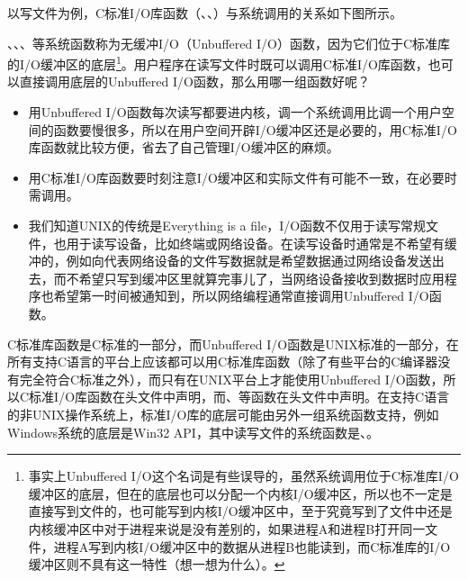 以写文件为例，C标准I/\BookSplit{}O库函数（、、）与系统调用的关系如下图所示。




、、、等系统函数称为无缓冲I/\BookSplit{}O（Unbuffered I/\BookSplit{}O）函数，因为它们位于C标准库的I/\BookSplit{}O缓冲区的底层\footnote[36]{事实上Unbuffered I/O这个名词是有些误导的，虽然系统调用位于C标准库I/O缓冲区的底层，但在的底层也可以分配一个内核I/O缓冲区，所以也不一定是直接写到文件的，也可能写到内核I/O缓冲区中，至于究竟写到了文件中还是内核缓冲区中对于进程来说是没有差别的，如果进程A和进程B打开同一文件，进程A写到内核I/O缓冲区中的数据从进程B也能读到，而C标准库的I/O缓冲区则不具有这一特性（想一想为什么）。}。用户程序在读写文件时既可以调用C标准I/\BookSplit{}O库函数，也可以直接调用底层的Unbuffered I/\BookSplit{}O函数，那么用哪一组函数好呢？


\begin{itemize}

\item 用Unbuffered I/\BookSplit{}O函数每次读写都要进内核，调一个系统调用比调一个用户空间的函数要慢很多，所以在用户空间开辟I/\BookSplit{}O缓冲区还是必要的，用C标准I/\BookSplit{}O库函数就比较方便，省去了自己管理I/\BookSplit{}O缓冲区的麻烦。

\item 用C标准I/\BookSplit{}O库函数要时刻注意I/\BookSplit{}O缓冲区和实际文件有可能不一致，在必要时需调用。

\item 我们知道UNIX的传统是Everything is a file，I/\BookSplit{}O函数不仅用于读写常规文件，也用于读写设备，比如终端或网络设备。在读写设备时通常是不希望有缓冲的，例如向代表网络设备的文件写数据就是希望数据通过网络设备发送出去，而不希望只写到缓冲区里就算完事儿了，当网络设备接收到数据时应用程序也希望第一时间被通知到，所以网络编程通常直接调用Unbuffered I/\BookSplit{}O函数。
\end{itemize}


C标准库函数是C标准的一部分，而Unbuffered I/\BookSplit{}O函数是UNIX标准的一部分，在所有支持C语言的平台上应该都可以用C标准库函数（除了有些平台的C编译器没有完全符合C标准之外），而只有在UNIX平台上才能使用Unbuffered I/\BookSplit{}O函数，所以C标准I/\BookSplit{}O库函数在头文件中声明，而、等函数在头文件中声明。在支持C语言的非UNIX操作系统上，标准I/\BookSplit{}O库的底层可能由另外一组系统函数支持，例如Windows系统的底层是Win32 API，其中读写文件的系统函数是、。


